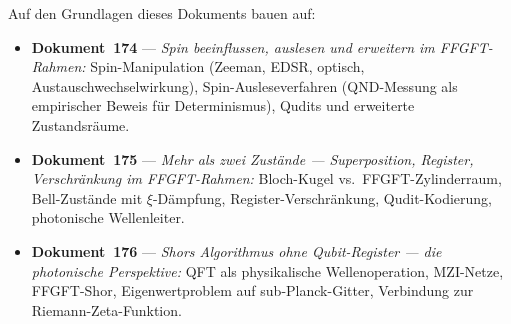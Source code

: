 Auf den Grundlagen dieses Dokuments bauen auf:

\begin{itemize}
  \item \textbf{Dokument~174} --- \textit{Spin beeinflussen, auslesen und erweitern
    im FFGFT-Rahmen:}
    Spin-Manipulation (Zeeman, EDSR, optisch, Austauschwechselwirkung),
    Spin-Ausleseverfahren (QND-Messung als empirischer Beweis für Determinismus),
    Qudits und erweiterte Zustandsräume.

  \item \textbf{Dokument~175} --- \textit{Mehr als zwei Zustände --- Superposition,
    Register, Verschränkung im FFGFT-Rahmen:}
    Bloch-Kugel vs.\ FFGFT-Zylinderraum, Bell-Zustände mit $\xi$-Dämpfung,
    Register-Verschränkung, Qudit-Kodierung, photonische Wellenleiter.

  \item \textbf{Dokument~176} --- \textit{Shors Algorithmus ohne Qubit-Register
    --- die photonische Perspektive:}
    QFT als physikalische Wellenoperation, MZI-Netze, FFGFT-Shor,
    Eigenwertproblem auf sub-Planck-Gitter, Verbindung zur Riemann-Zeta-Funktion.
\end{itemize}
